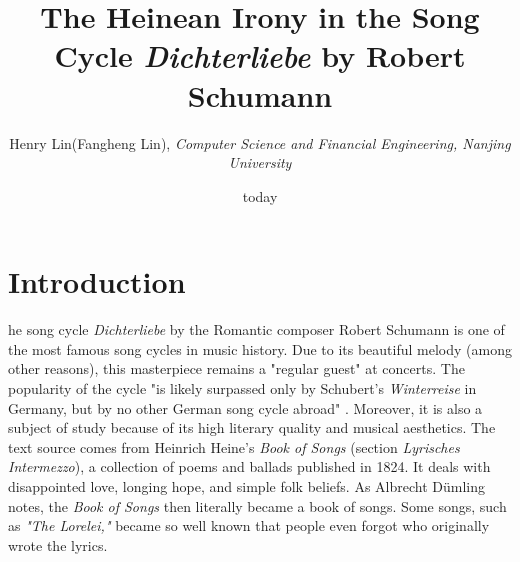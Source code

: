 \documentclass[10pt,a4paper,onecolumn]{rho}
\title{The Heinean Irony in the Song Cycle \textit{Dichterliebe} by Robert Schumann}
\author{Henry Lin(Fangheng Lin), \textit{Computer Science and Financial Engineering, Nanjing University}}
\affil{\quad NJU mail: 231275040@smail.nju.edu.cn}
\date{today}
\begin{document}
	

    \maketitle
    \thispagestyle{firststyle}
    \tableofcontents

    \onecolumn
\section{Introduction}
    he song cycle \textit{Dichterliebe} by the Romantic composer Robert Schumann is one of the most famous song cycles in music history. Due to its beautiful melody (among other reasons), this masterpiece remains a "regular guest" at concerts. The popularity of the cycle "is likely surpassed only by Schubert's \textit{Winterreise} in Germany, but by no other German song cycle abroad" . Moreover, it is also a subject of study because of its high literary quality and musical aesthetics. The text source comes from Heinrich Heine's \textit{Book of Songs} (section \textit{Lyrisches Intermezzo}), a collection of poems and ballads published in 1824. It deals with disappointed love, longing hope, and simple folk beliefs. As Albrecht Dümling notes, the \textit{Book of Songs} then literally became a book of songs. Some songs, such as\textit{ "The Lorelei,"} became so well known that people even forgot who originally wrote the lyrics.
\end{document}
